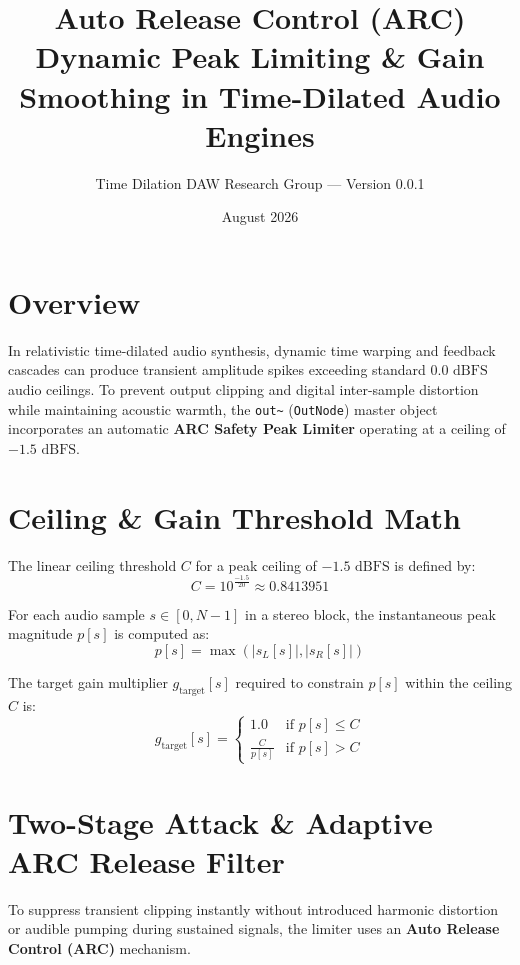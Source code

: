 \documentclass[11pt,a4paper]{article}
\title{\textbf{Auto Release Control (ARC) Dynamic Peak Limiting \& Gain Smoothing in Time-Dilated Audio Engines}}
\author{Time Dilation DAW Research Group --- Version 0.0.1}
\date{August 2026}
\begin{document}
\maketitle

\section{Overview}
In relativistic time-dilated audio synthesis, dynamic time warping and feedback cascades can produce transient amplitude spikes exceeding standard $0.0 \text{ dBFS}$ audio ceilings. To prevent output clipping and digital inter-sample distortion while maintaining acoustic warmth, the \texttt{out\textasciitilde} (\texttt{OutNode}) master object incorporates an automatic \textbf{ARC Safety Peak Limiter} operating at a ceiling of $-1.5 \text{ dBFS}$.

\section{Ceiling \& Gain Threshold Math}
The linear ceiling threshold $C$ for a peak ceiling of $-1.5 \text{ dBFS}$ is defined by:
\begin{equation}
C = 10^{\frac{-1.5}{20}} \approx 0.8413951
\end{equation}

For each audio sample $s \in [0, N-1]$ in a stereo block, the instantaneous peak magnitude $p[s]$ is computed as:
\begin{equation}
p[s] = \max\left(|s_L[s]|, |s_R[s]|\right)
\end{equation}

The target gain multiplier $g_{\text{target}}[s]$ required to constrain $p[s]$ within the ceiling $C$ is:
\begin{equation}
g_{\text{target}}[s] = \begin{cases}
1.0 & \text{if } p[s] \le C \\
\frac{C}{p[s]} & \text{if } p[s] > C
\end{cases}
\end{equation}

\section{Two-Stage Attack \& Adaptive ARC Release Filter}
To suppress transient clipping instantly without introduced harmonic distortion or audible pumping during sustained signals, the limiter uses an \textbf{Auto Release Control (ARC)} mechanism.
\end{document}
